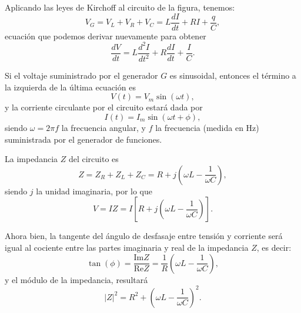 \documentclass[laboratorio]{guia}
\begin{document}
Aplicando las leyes de Kirchoff al circuito de la figura, 
tenemos:
\begin{equation}
    V_G = V_L + V_R + V_C = L \frac{dI}{dt} + RI + \frac{q}{C},
\end{equation}
ecuaci\'on que podemos derivar nuevamente para obtener
\begin{equation}
    \frac{dV}{dt} = L \frac{d^2I}{dt^2} + R \frac{dI}{dt} + \frac{I}{C}.
\end{equation}

Si el voltaje suministrado por el generador $G$ es sinusoidal, entonces el 
t\'ermino a la izquierda de la \'ultima ecuaci\'on es
\begin{equation}
    V(t) = V_m \sin \left( \omega t \right),
\end{equation}
y la corriente circulante por el circuito estar\'a dada por
\begin{equation}
    I(t) = I_m \sin \left( \omega t + \phi \right),
\end{equation}
siendo $\omega = 2\pi f$ la frecuencia angular, y $f$ la frecuencia 
(medida en Hz) suministrada por el generador de funciones. 

La impedancia $Z$ del circuito es 
\begin{equation}
    Z = Z_R + Z_L + Z_C = R + j \left( \omega L - \frac{1}{\omega C} \right),
\end{equation}
siendo $j$ la unidad imaginaria, por lo que
\begin{equation}
    V = IZ = I \left[ R + j \left( \omega L - \frac{1}{\omega C} \right) \right].
\end{equation}

Ahora bien, la tangente del \'angulo de desfasaje entre tensi\'on y corriente
ser\'a igual al cociente entre las partes imaginaria y real de la impedancia
$Z$, es decir:
\begin{equation}
    \tan \left( \phi \right) = \frac{\text{Im} Z}{\text{Re} Z} = 
    \frac{1}{R} \left(\omega L - \frac{1}{\omega C} \right),
\end{equation}
y el m\'odulo de la impedancia, resultar\'a
\begin{equation}
    |Z|^2 = R^2 + \left( \omega L - \frac{1}{\omega C} \right)^2.
\end{equation}
\end{document}
